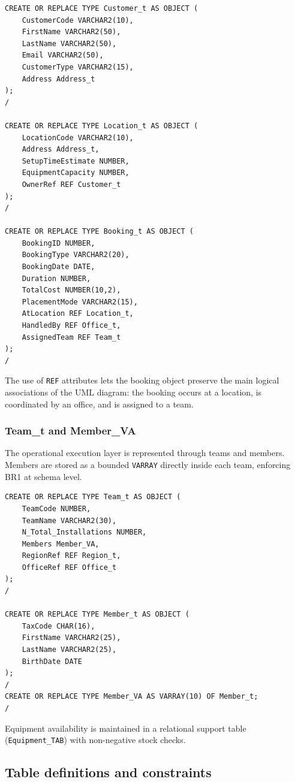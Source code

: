 \documentclass[12pt,a4paper]{article}
\begin{document}
\begin{verbatim}
CREATE OR REPLACE TYPE Customer_t AS OBJECT (
    CustomerCode VARCHAR2(10),
    FirstName VARCHAR2(50),
    LastName VARCHAR2(50),
    Email VARCHAR2(50),
    CustomerType VARCHAR2(15),
    Address Address_t
);
/

CREATE OR REPLACE TYPE Location_t AS OBJECT (
    LocationCode VARCHAR2(10),
    Address Address_t,
    SetupTimeEstimate NUMBER,
    EquipmentCapacity NUMBER,
    OwnerRef REF Customer_t
);
/

CREATE OR REPLACE TYPE Booking_t AS OBJECT (
    BookingID NUMBER,
    BookingType VARCHAR2(20),
    BookingDate DATE,
    Duration NUMBER,
    TotalCost NUMBER(10,2),
    PlacementMode VARCHAR2(15),
    AtLocation REF Location_t,
    HandledBy REF Office_t,
    AssignedTeam REF Team_t
);
/
\end{verbatim}

The use of \texttt{REF} attributes lets the booking object preserve the main logical associations of the UML diagram: the booking occurs at a location, is coordinated by an office, and is assigned to a team.

\subsubsection*{Team\_t and Member\_VA}
The operational execution layer is represented through teams and members. Members are stored as a bounded \texttt{VARRAY} directly inside each team, enforcing BR1 at schema level.

\begin{verbatim}
CREATE OR REPLACE TYPE Team_t AS OBJECT (
    TeamCode NUMBER,
    TeamName VARCHAR2(30),
    N_Total_Installations NUMBER,
    Members Member_VA,
    RegionRef REF Region_t,
    OfficeRef REF Office_t
);
/

CREATE OR REPLACE TYPE Member_t AS OBJECT (
    TaxCode CHAR(16),
    FirstName VARCHAR2(25),
    LastName VARCHAR2(25),
    BirthDate DATE
);
/
CREATE OR REPLACE TYPE Member_VA AS VARRAY(10) OF Member_t;
/
\end{verbatim}

Equipment availability is maintained in a relational support table (\texttt{Equipment\_TAB}) with non-negative stock checks.

\subsection{Table definitions and constraints}
\end{document}
